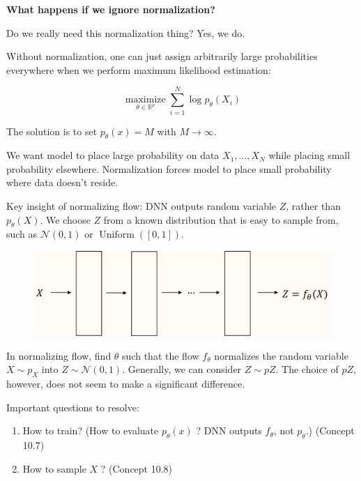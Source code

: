 \begin{concept}
    \textbf{What happens if we ignore normalization?}

    Do we really need this normalization thing? Yes, we do.

    Without normalization, one can just assign arbitrarily large probabilities everywhere when we perform maximum likelihood estimation:

    $$
    \underset{\theta \in \mathbb{R}^{p}}{\operatorname{maximize}} \sum_{i=1}^{N} \log p_{\theta}\left(X_{i}\right)
    $$

    The solution is to set $p_{\theta}(x)=M$ with $M \rightarrow \infty$.

    We want model to place large probability on data $X_{1}, \ldots, X_{N}$ while placing small probability elsewhere. Normalization forces model to place small probability where data doesn't reside.
\end{concept}

\par\noindent\textcolor{gray}{\hdashrule{\textwidth}{0.4pt}{1pt 2pt}}

\begin{definition}
    Key insight of normalizing flow: DNN outputs random variable $Z$, rather than $p_{\theta}(X)$.
    We choose \( Z \) from a known distribution that is easy to sample from, such as \( \mathcal{N}(0,1) \) or \( \operatorname{Uniform}([0,1]) \).

    \begin{figure}[H]
        \centering
        \includegraphics[width=1.0\textwidth]{.././assets/10.6.png}
    \end{figure}

    In normalizing flow, find $\theta$ such that the flow $f_{\theta}$ normalizes the random variable $X \sim p_{X}$ into $Z \sim \mathcal{N}(0,1)$.
    Generally, we can consider $Z \sim pZ$. The choice of $pZ$, however, does not seem to make a significant difference.

    Important questions to resolve:

    \begin{enumerate}
        \item How to train? (How to evaluate $p_{\theta}(x)$ ? DNN outputs $f_{\theta}$, not $p_{\theta}$.) (Concept 10.7)
        \item How to sample $X$ ? (Concept 10.8)
    \end{enumerate}
\end{definition}

